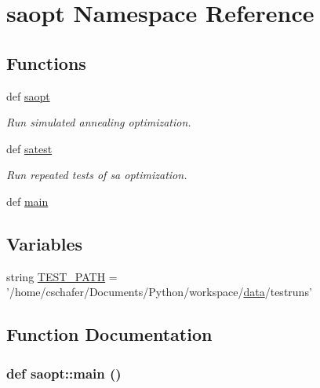 \hypertarget{namespacesaopt}{
\section{saopt Namespace Reference}
\label{namespacesaopt}
}
\subsection*{Functions}
\begin{CompactItemize}
\item 
def \hyperlink{namespacesaopt_27363a0082deed7804d30ebdf145cd0a}{saopt}
\begin{CompactList}\small\item\em Run simulated annealing optimization. \item\end{CompactList}\item 
def \hyperlink{namespacesaopt_515091c950b58a3cc0c8e785fc3f802a}{satest}
\begin{CompactList}\small\item\em Run repeated tests of sa optimization. \item\end{CompactList}\item 
def \hyperlink{namespacesaopt_cc9749cdc655806017ef69dc2654c483}{main}
\end{CompactItemize}
\subsection*{Variables}
\begin{CompactItemize}
\item 
string \hyperlink{namespacesaopt_4077ce3616d15b802bafa0748162883e}{TEST\_\-PATH} = '/home/cschafer/Documents/Python/workspace/\hyperlink{classsampling_1_1data}{data}/testruns'
\end{CompactItemize}


\subsection{Function Documentation}
\hypertarget{namespacesaopt_cc9749cdc655806017ef69dc2654c483}{
\subsubsection[{main}]{\setlength{\rightskip}{0pt plus 5cm}def saopt::main ()}}
\label{namespacesaopt_cc9749cdc655806017ef69dc2654c483}


